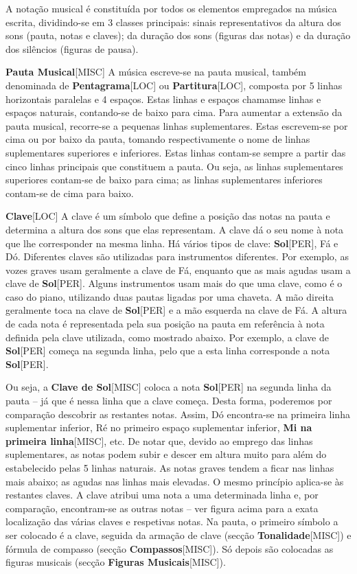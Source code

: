 \documentclass[a4paper,12pt]{article}
\begin{document}
A notação musical é constituída por todos os elementos empregados na música escrita, dividindo-se em 3 classes principais: sinais representativos da altura dos sons (pauta, notas e claves); da duração dos sons (figuras das notas) e da duração dos silêncios (figuras de pausa).

\textbf{Pauta Musical}\textsc{[MISC]} A música escreve-se na pauta musical, também denominada de \textbf{Pentagrama}\textsc{[LOC]} ou \textbf{Partitura}\textsc{[LOC]}, composta por 5 linhas horizontais paralelas e 4 espaços. Estas linhas e espaços chamamse linhas e espaços naturais, contando-se de baixo para cima. Para aumentar a extensão da pauta musical, recorre-se a pequenas linhas suplementares. Estas escrevem-se por cima ou por baixo da pauta, tomando respectivamente o nome de linhas suplementares superiores e inferiores. Estas linhas contam-se sempre a partir das cinco linhas principais que constituem a pauta. Ou seja, as linhas suplementares superiores contam-se de baixo para cima; as linhas suplementares inferiores contam-se de cima para baixo.

\textbf{Clave}\textsc{[LOC]} A clave é um símbolo que define a posição das notas na pauta e determina a altura dos sons que elas representam. A clave dá o seu nome à nota que lhe corresponder na mesma linha. Há vários tipos de clave: \textbf{Sol}\textsc{[PER]}, Fá e Dó. Diferentes claves são utilizadas para instrumentos diferentes. Por exemplo, as vozes graves usam geralmente a clave de Fá, enquanto que as mais agudas usam a clave de \textbf{Sol}\textsc{[PER]}. Alguns instrumentos usam mais do que uma clave, como é o caso do piano, utilizando duas pautas ligadas por uma chaveta. A mão direita geralmente toca na clave de \textbf{Sol}\textsc{[PER]} e a mão esquerda na clave de Fá. A altura de cada nota é representada pela sua posição na pauta em referência à nota definida pela clave utilizada, como mostrado abaixo. Por exemplo, a clave de \textbf{Sol}\textsc{[PER]} começa na segunda linha, pelo que a esta linha corresponde a nota \textbf{Sol}\textsc{[PER]}.

Ou seja, a \textbf{Clave de Sol}\textsc{[MISC]} coloca a nota \textbf{Sol}\textsc{[PER]} na segunda linha da pauta -- já que é nessa linha que a clave começa. Desta forma, poderemos por comparação descobrir as restantes notas. Assim, Dó encontra-se na primeira linha suplementar inferior, Ré no primeiro espaço suplementar inferior, \textbf{Mi na primeira linha}\textsc{[MISC]}, etc. De notar que, devido ao emprego das linhas suplementares, as notas podem subir e descer em altura muito para além do estabelecido pelas 5 linhas naturais. As notas graves tendem a ficar nas linhas mais abaixo; as agudas nas linhas mais elevadas. O mesmo princípio aplica-se às restantes claves. A clave atribui uma nota a uma determinada linha e, por comparação, encontram-se as outras notas -- ver figura acima para a exata localização das várias claves e respetivas notas. Na pauta, o primeiro símbolo a ser colocado é a clave, seguida da armação de clave (secção \textbf{Tonalidade}\textsc{[MISC]}) e fórmula de compasso (secção \textbf{Compassos}\textsc{[MISC]}). Só depois são colocadas as figuras musicais (secção \textbf{Figuras Musicais}\textsc{[MISC]}).
\end{document}
